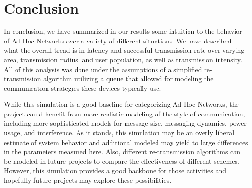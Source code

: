 \section{Conclusion}
In conclusion, we have summarized in our results some intuition to the behavior of Ad-Hoc Networks
over a variety of different situations.
We have described what the overall trend is in latency and successful transmission rate
over varying area, transmission radius, and user population, as well as transmission intensity.
All of this analysis was done under the assumptions of a simplified re-transmission algorithm
utilizing a queue that allowed for modeling the communication strategies these devices typically
use.

While this simulation is a good baseline for categorizing Ad-Hoc Networks, the project could
benefit from more realistic modeling of the style of communication, including more sophisticated
models for message size, messaging dynamics, power usage, and interference.
As it stands, this simulation may be an overly liberal estimate of system behavior and additional
modeled may yield to large differences in the parameters measured here.
Also, different re-transmission algorithms can be modeled in future projects to compare
the effectiveness of different schemes.
However, this simulation provides a good backbone for those activities and hopefully future
projects may explore these possibilities.
